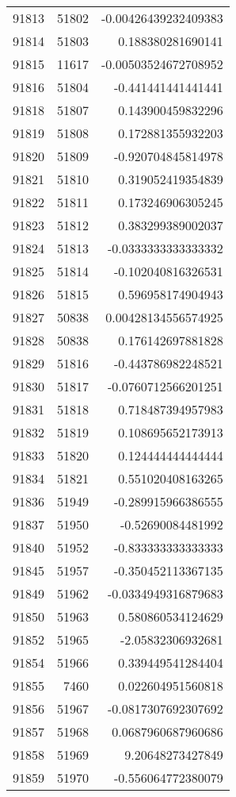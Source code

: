 \begin{tabular}{r | r | r}
91813 & 51802 & -0.00426439232409383 \\
91814 & 51803 & 0.188380281690141 \\
91815 & 11617 & -0.00503524672708952 \\
91816 & 51804 & -0.441441441441441 \\
91818 & 51807 & 0.143900459832296 \\
91819 & 51808 & 0.172881355932203 \\
91820 & 51809 & -0.920704845814978 \\
91821 & 51810 & 0.319052419354839 \\
91822 & 51811 & 0.173246906305245 \\
91823 & 51812 & 0.383299389002037 \\
91824 & 51813 & -0.0333333333333332 \\
91825 & 51814 & -0.102040816326531 \\
91826 & 51815 & 0.596958174904943 \\
91827 & 50838 & 0.00428134556574925 \\
91828 & 50838 & 0.176142697881828 \\
91829 & 51816 & -0.443786982248521 \\
91830 & 51817 & -0.0760712566201251 \\
91831 & 51818 & 0.718487394957983 \\
91832 & 51819 & 0.108695652173913 \\
91833 & 51820 & 0.124444444444444 \\
91834 & 51821 & 0.551020408163265 \\
91836 & 51949 & -0.289915966386555 \\
91837 & 51950 & -0.52690084481992 \\
91840 & 51952 & -0.833333333333333 \\
91845 & 51957 & -0.350452113367135 \\
91849 & 51962 & -0.0334949316879683 \\
91850 & 51963 & 0.580860534124629 \\
91852 & 51965 & -2.05832306932681 \\
91854 & 51966 & 0.339449541284404 \\
91855 & 7460 & 0.022604951560818 \\
91856 & 51967 & -0.0817307692307692 \\
91857 & 51968 & 0.0687960687960686 \\
91858 & 51969 & 9.20648273427849 \\
91859 & 51970 & -0.556064772380079 \\

\end{tabular}

